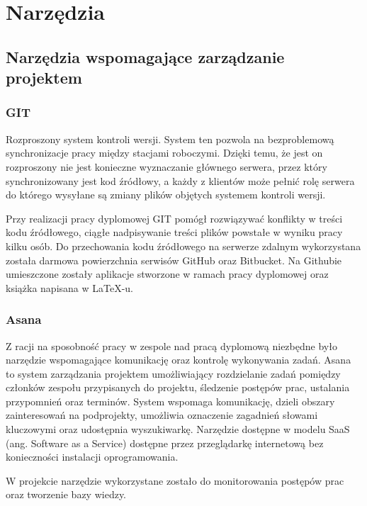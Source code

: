 \newpage
\section{Narzędzia}
\label{sec:tools}

\subsection{Narzędzia wspomagające zarządzanie projektem}

\subsubsection{GIT}
\label{sub:GIT}
Rozproszony system kontroli wersji. System ten pozwola na bezproblemową synchronizacje pracy między stacjami roboczymi. Dzięki temu, że jest on rozproszony nie jest konieczne wyznaczanie głównego serwera, przez który synchronizowany jest kod źródłowy, a każdy z klientów może pełnić rolę serwera do którego wysyłane są zmiany plików objętych systemem kontroli wersji.

Przy realizacji pracy dyplomowej GIT pomógł rozwiązywać konflikty w treści kodu źródłowego, ciągłe nadpisywanie treści plików powstałe w wyniku pracy kilku osób. Do przechowania kodu źródłowego na serwerze zdalnym wykorzystana została darmowa powierzchnia serwisów GitHub oraz Bitbucket. Na Githubie umieszczone zostały aplikacje stworzone w ramach pracy dyplomowej oraz książka napisana w LaTeX-u.


\subsubsection{Asana}
\label{sub:Asana}

Z racji na sposobność pracy w zespole nad pracą dyplomową niezbędne było narzędzie wspomagające komunikację oraz kontrolę wykonywania zadań. Asana to system zarządzania projektem umożliwiający rozdzielanie zadań pomiędzy członków zespołu przypisanych do projektu, śledzenie postępów prac, ustalania przypomnień oraz terminów. System wspomaga komunikację, dzieli obszary zainteresowań na podprojekty, umożliwia oznaczenie zagadnień słowami kluczowymi oraz udostępnia wyszukiwarkę. Narzędzie dostępne w modelu SaaS (ang. Software as a Service) dostępne przez przeglądarkę internetową bez konieczności instalacji oprogramowania.

W projekcie narzędzie wykorzystane zostało do monitorowania postępów prac oraz tworzenie bazy wiedzy.

